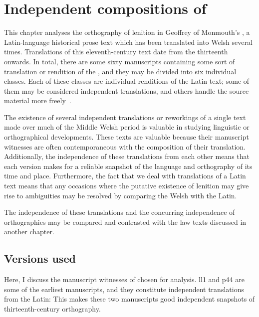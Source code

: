 \chapter{Independent compositions of }
This chapter analyses the orthography of lenition in Geoffrey of Monmouth's , a Latin-language historical prose text which has been translated into Welsh several times. Translations of this eleventh-century text date from the thirteenth onwards. In total, there are some sixty manuscripts containing some sort of translation or rendition of the , and they may be divided into six individual classes. Each of these classes are individual renditions of the Latin text; some of them may be considered independent translations, and others handle the source material more freely~\autocite[xxiv-xxxi]{roberts_brut_1971}.

The existence of several independent translations or reworkings of a single text made over much of the Middle Welsh period is valuable in studying linguistic or orthographical developments. These texts are valuable because their manuscript witnesses are often contemporaneous with the composition of their translation. Additionally, the independence of these translations from each other means that each version makes for a reliable snapshot of the language and orthography of its time and place. Furthermore, the fact that we deal with translations of a Latin text means that any occasions where the putative existence of lenition may give rise to ambiguities may be resolved by comparing the Welsh with the Latin. 

The independence of these translations and the concurring independence of orthographies may be compared and contrasted with the law texts discussed in another chapter. 

\section{Versions used}
Here, I discuss the manuscript witnesses of  chosen for analysis. \Gls{ll1} and \gls{p44} are some of the earliest manuscripts, and they constitute independent translations from the Latin:
This makes these two manuscripts good independent snapshots of thirteenth-century orthography.

